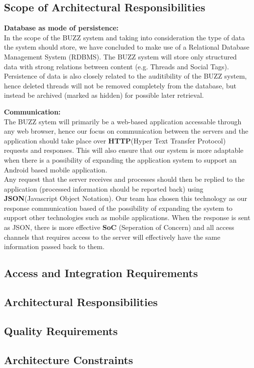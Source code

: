 
\subsection{Scope of Architectural Responsibilities}
\begin{flushleft}
	\begin{flushleft}
	\textbf{Database as mode of persistence: } \\
	In the scope of the BUZZ system and taking into consideration the type of data the system should store, we have concluded to make use of a Relational Database Management System (RDBMS). The BUZZ system will store only structured data with strong relations between content (e.g. Threads and Social Tags). Persistence of data is also closely related to the auditibility of the BUZZ system, hence deleted threads will not be removed completely from the database, but instead be archived (marked as hidden) for possible later retrieval.
	\end{flushleft}
	
	\begin{flushleft}
	\textbf{Communication:}\\
	The BUZZ sytem will primarily be a web-based application accessable through any web browser, hence our focus on communication between the servers and the application should take place over \textbf{HTTP}(Hyper Text Transfer Protocol) requests and responses. This will also ensure that our system is more adaptable when there is a possibility of expanding the application system to support an Android based mobile application. \\
	Any request that the server receives and processes should then be replied to the application (processed information should be reported back) using \textbf{JSON}(Javascript Object Notation). Our team has chosen this technology as our response communication based of the possibility of expanding the system to support other technologies such as mobile applications. When the response is sent as JSON, there is more effective \textbf{SoC} (Seperation of Concern) and all access channels that requires access to the server will effectively have the same information passed back to them.
	\end{flushleft}
\end{flushleft}

\subsection{Access and Integration Requirements}
\subsection{Architectural Responsibilities}
\subsection{Quality Requirements}
	
	
\subsection{Architecture Constraints}
